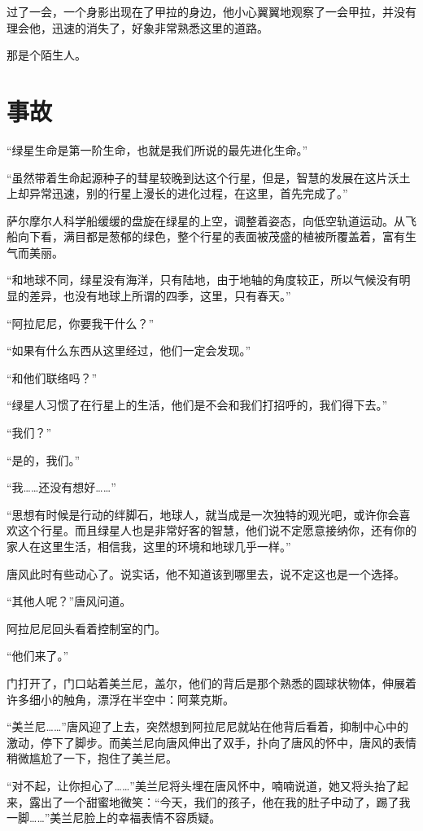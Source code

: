 过了一会，一个身影出现在了甲拉的身边，他小心翼翼地观察了一会甲拉，并没有理会他，迅速的消失了，好象非常熟悉这里的道路。

那是个陌生人。

\chapter{事故}

“绿星生命是第一阶生命，也就是我们所说的最先进化生命。”

“虽然带着生命起源种子的彗星较晚到达这个行星，但是，智慧的发展在这片沃土上却异常迅速，别的行星上漫长的进化过程，在这里，首先完成了。”

萨尔摩尔人科学船缓缓的盘旋在绿星的上空，调整着姿态，向低空轨道运动。从飞船向下看，满目都是葱郁的绿色，整个行星的表面被茂盛的植被所覆盖着，富有生气而美丽。

“和地球不同，绿星没有海洋，只有陆地，由于地轴的角度较正，所以气候没有明显的差异，也没有地球上所谓的四季，这里，只有春天。”

“阿拉尼尼，你要我干什么？”

“如果有什么东西从这里经过，他们一定会发现。”

“和他们联络吗？”

“绿星人习惯了在行星上的生活，他们是不会和我们打招呼的，我们得下去。”

“我们？”

“是的，我们。”

“我……还没有想好……”

“思想有时候是行动的绊脚石，地球人，就当成是一次独特的观光吧，或许你会喜欢这个行星。而且绿星人也是非常好客的智慧，他们说不定愿意接纳你，还有你的家人在这里生活，相信我，这里的环境和地球几乎一样。”

唐风此时有些动心了。说实话，他不知道该到哪里去，说不定这也是一个选择。

“其他人呢？”唐风问道。

阿拉尼尼回头看着控制室的门。

“他们来了。”

门打开了，门口站着美兰尼，盖尔，他们的背后是那个熟悉的圆球状物体，伸展着许多细小的触角，漂浮在半空中：阿莱克斯。

“美兰尼……”唐风迎了上去，突然想到阿拉尼尼就站在他背后看着，抑制中心中的激动，停下了脚步。而美兰尼向唐风伸出了双手，扑向了唐风的怀中，唐风的表情稍微尴尬了一下，抱住了美兰尼。

“对不起，让你担心了……”美兰尼将头埋在唐风怀中，喃喃说道，她又将头抬了起来，露出了一个甜蜜地微笑：“今天，我们的孩子，他在我的肚子中动了，踢了我一脚……”美兰尼脸上的幸福表情不容质疑。

